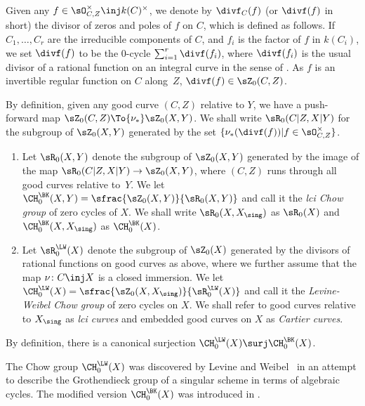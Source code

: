 Given any $f \in \sO^{\times}_{C, Z} \inj k(C)^{\times}$, we denote by
$\divf_C(f)$ (or $\divf(f)$ in short)
the divisor of zeros and poles of $f$ on $C$, which is defined as follows. If
$C_1,\ldots, C_r$ are the irreducible components of $C$,
and $f_i$ is the factor of $f$ in $k(C_i)$, we set
$\divf(f)$ to be the $0$-cycle $\sum_{i=1}^r \divf(f_i)$, where
$\divf(f_i)$ is the usual
divisor of a rational function on an integral curve in the sense of
\cite{Fulton}. As $f$ is an invertible
regular function on $C$ along~$Z$, $\divf(f)\in \sZ_0(C,Z)$.

By definition, given any good curve $(C,Z)$ relative to $Y$, we have a
push-forward map $\sZ_0(C,Z)\To{\nu_{*}} \sZ_0(X,Y)$.
We shall write $\sR_0(C|Z, X|Y)$ for the subgroup
of $\sZ_0(X, Y)$ generated by the set
$\{\nu_*(\divf(f))| f \in \sO^{\times}_{C, Z}\}$.

\skpt
\begin{defn} \label{def:LWandlciChow}
\begin{enumerate}
\item
Let $\sR_0(X,Y)$ denote the subgroup of $\sZ_0(X, Y)$ generated
by
the image of the map $\sR_0(C|Z, X|Y) \to \sZ_0(X, Y)$, where
$(C, Z)$ runs through all good curves relative to~$Y$.
We let $\CH^{\BK}_0(X,Y) = \sfrac{\sZ_0(X, Y)}{\sR_0(X,Y)}$ and call it the
\emph{lci Chow group} of zero cycles of $X$.
We shall write $\sR_0(X,X_\sing)$ as $\sR_0(X)$ and $\CH^{\BK}_0(X,X_\sing)$
as $\CH^{\BK}_0(X)$.

\item
Let $\sR^{\LW}_0(X)$ denote the subgroup of $\sZ_0(X)$ generated
by the divisors of rational functions on good curves as above, where
we further assume that the map $\nu\colon C \inj X$ is a closed immersion.
We let $\CH^{\LW}_0(X)=\sfrac{\sZ_0(X, X_{\sing})}{\sR^{\LW}_0(X)}$ and call it
the \emph{Levine-Weibel Chow group} of zero cycles on $X$.
We shall refer to good curves relative to $X_\sing$ as \emph{lci curves} and
embedded good curves on $X$ as \emph{Cartier curves}.\enlargethispage{\baselineskip}%
\end{enumerate}
\end{defn}
By definition, there is a canonical surjection
$\CH^{\LW}_0(X) \surj \CH^{\BK}_0(X)$.

\begin{remk}
The Chow group $\CH^{\LW}_0(X)$ was
discovered by Levine and Weibel~\cite{LW} in an attempt to describe the
Grothendieck group of a singular scheme in terms of algebraic cycles.
The modified version $\CH^{\BK}_0(X)$ was introduced in \cite{BK}.
\end{remk}

